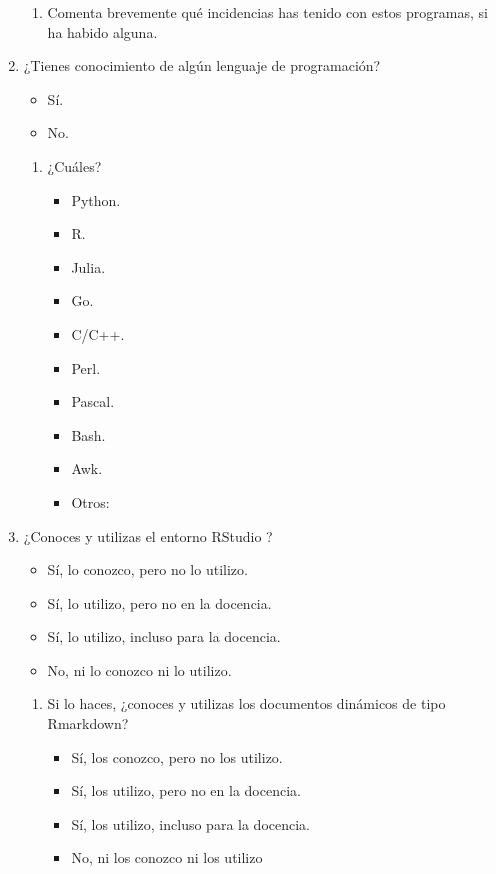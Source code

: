 \documentclass[a4paper,12pt]{article}
\begin{document}
\begin{enumerate}
\begin{enumerate}
   \item Comenta brevemente qué incidencias has tenido con estos programas, si ha habido alguna.
      \vspace*{1cm}
   \end{enumerate}

\item ¿Tienes conocimiento de algún lenguaje de programación?
   \begin{itemize}
   \item Sí.
   \item No.
   \end{itemize}

   \begin{enumerate}
   \item ¿Cuáles?
      \begin{itemize}
      \item Python.
      \item R.
      \item Julia.
      \item Go.
      \item C/C++.
      \item Perl.
      \item Pascal.
      \item Bash.
      \item Awk.
      \item Otros:
      \end{itemize}
   \end{enumerate}

\item ¿Conoces y utilizas el entorno RStudio \cite{RStudio}?
   \begin{itemize}
   \item Sí, lo conozco, pero no lo utilizo.
   \item Sí, lo utilizo, pero no en la docencia.
   \item Sí, lo utilizo, incluso para la docencia.
   \item No, ni lo conozco ni lo utilizo.
   \end{itemize}

   \begin{enumerate}
   \item Si lo haces, ¿conoces y utilizas los documentos dinámicos de tipo Rmarkdown?
      \begin{itemize}
      \item Sí, los conozco, pero no los utilizo.
      \item Sí, los utilizo, pero no en la docencia.
      \item Sí, los utilizo, incluso para la docencia.
      \item No, ni los conozco ni los utilizo
      \end{itemize}


\end{enumerate}
\end{enumerate}
\end{document}
